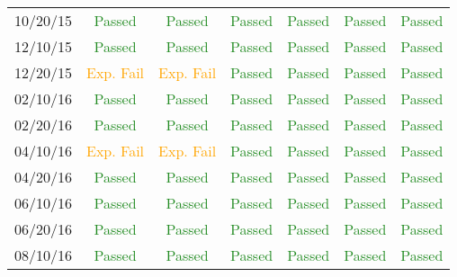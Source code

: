 \begin{table}[htbp]
\begin{tabular}{c | c | c | c | c | c | c}
      10/20/15 & \textcolor{ForestGreen}{Passed} & \textcolor{ForestGreen}{Passed} &  \textcolor{ForestGreen}{Passed}&  \textcolor{ForestGreen}{Passed} & \textcolor{ForestGreen}{Passed} &  \textcolor{ForestGreen}{Passed}\\
      12/10/15 & \textcolor{ForestGreen}{Passed} & \textcolor{ForestGreen}{Passed} &  \textcolor{ForestGreen}{Passed}&  \textcolor{ForestGreen}{Passed} & \textcolor{ForestGreen}{Passed} &  \textcolor{ForestGreen}{Passed}\\
      12/20/15 & \textcolor{orange}{Exp. Fail} & \textcolor{orange}{Exp. Fail} &  \textcolor{ForestGreen}{Passed}&  \textcolor{ForestGreen}{Passed} & \textcolor{ForestGreen}{Passed} &  \textcolor{ForestGreen}{Passed}\\
      02/10/16 & \textcolor{ForestGreen}{Passed} & \textcolor{ForestGreen}{Passed} &  \textcolor{ForestGreen}{Passed}&  \textcolor{ForestGreen}{Passed} & \textcolor{ForestGreen}{Passed} &  \textcolor{ForestGreen}{Passed}\\
      02/20/16 & \textcolor{ForestGreen}{Passed} & \textcolor{ForestGreen}{Passed} &  \textcolor{ForestGreen}{Passed}&  \textcolor{ForestGreen}{Passed} & \textcolor{ForestGreen}{Passed} &  \textcolor{ForestGreen}{Passed}\\
      04/10/16 & \textcolor{orange}{Exp. Fail} & \textcolor{orange}{Exp. Fail} &  \textcolor{ForestGreen}{Passed}&  \textcolor{ForestGreen}{Passed} & \textcolor{ForestGreen}{Passed} &  \textcolor{ForestGreen}{Passed}\\
      04/20/16 & \textcolor{ForestGreen}{Passed} & \textcolor{ForestGreen}{Passed} &  \textcolor{ForestGreen}{Passed}&  \textcolor{ForestGreen}{Passed} & \textcolor{ForestGreen}{Passed} &  \textcolor{ForestGreen}{Passed}\\
      06/10/16 & \textcolor{ForestGreen}{Passed} & \textcolor{ForestGreen}{Passed} &  \textcolor{ForestGreen}{Passed}&  \textcolor{ForestGreen}{Passed} & \textcolor{ForestGreen}{Passed} &  \textcolor{ForestGreen}{Passed}\\
      06/20/16 & \textcolor{ForestGreen}{Passed} & \textcolor{ForestGreen}{Passed} &  \textcolor{ForestGreen}{Passed}&  \textcolor{ForestGreen}{Passed} & \textcolor{ForestGreen}{Passed} &  \textcolor{ForestGreen}{Passed}\\
      08/10/16 & \textcolor{ForestGreen}{Passed} & \textcolor{ForestGreen}{Passed} &  \textcolor{ForestGreen}{Passed}&  \textcolor{ForestGreen}{Passed} & \textcolor{ForestGreen}{Passed} &  \textcolor{ForestGreen}{Passed}\\

\end{tabular}
\end{table}
